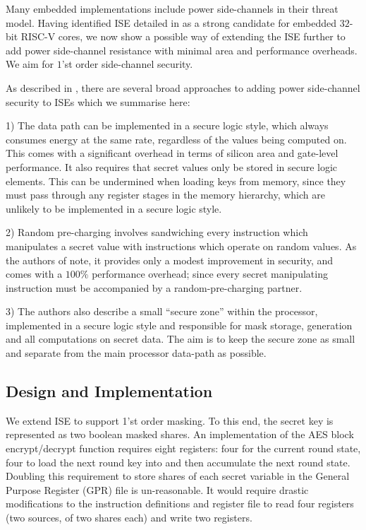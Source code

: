 
Many embedded implementations include power side-channels in their threat
model.
Having identified ISE  detailed in
 as a strong candidate for embedded $32$-bit
RISC-V cores, we now show a possible
way of extending the ISE further to add power side-channel resistance
with minimal area and performance overheads.
We aim for $1$'st order side-channel security.

As described in \cite{TilGro:07}, there are several broad approaches
to adding power side-channel security to ISEs which we summarise here:

1) The data path can be implemented in a secure logic style, which always
consumes energy at the same rate, regardless of the values being computed on.
This comes with a significant overhead in terms of silicon area and
gate-level performance.
It also requires that secret values only be stored in secure logic
elements.
This can be undermined when loading keys from memory, since they must
pass through any register stages in the memory hierarchy, which are
unlikely to be implemented in a secure logic style.

2) Random pre-charging involves sandwiching every instruction which
manipulates a secret value with instructions which operate on random values.
As the authors of \cite{TilGro:07} note, it provides only a modest
improvement in security, and comes with a $100\%$ performance overhead;
since every secret manipulating instruction must be accompanied by
a random-pre-charging partner.

3) The authors also describe a small ``secure zone'' within the processor,
implemented in a secure logic style and responsible for
mask storage, generation and all computations on secret data.
The aim is to keep the secure zone as small and separate from the main
processor data-path as possible.

\subsection{Design and Implementation}

We extend ISE  to support 1'st order masking.
To this end, the secret key is represented as two boolean masked shares.
An implementation of the AES block encrypt/decrypt function requires
eight registers: four for the current round state, four to load the
next round key into and then accumulate the next round state.
Doubling this requirement to store shares of each secret variable
in the General Purpose Register (GPR) file is un-reasonable.
It would require drastic modifications to the instruction definitions and
register file to read four registers (two sources, of two shares each) and
write two registers.

